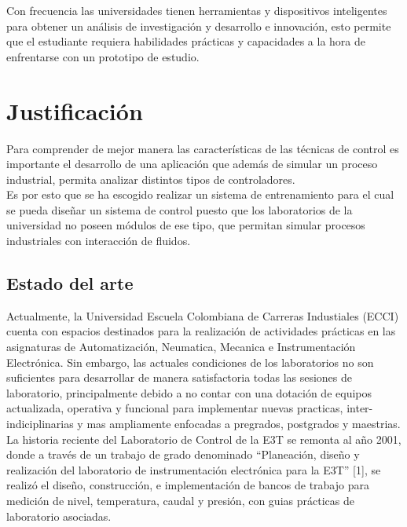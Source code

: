 \documentclass[a4paper,12pt,twoside]{proyectotanquesecci}
\begin{document}
Con frecuencia las universidades tienen herramientas y dispositivos inteligentes para obtener un análisis de investigación y desarrollo e innovación, esto permite que el estudiante requiera habilidades prácticas y capacidades a la hora de enfrentarse con un prototipo de estudio.\\






\chapter{Justificación}

Para comprender de mejor manera las características de las técnicas de control es importante el desarrollo de una aplicación que además de simular un proceso industrial, permita analizar distintos tipos de controladores. \\

Es por esto que se ha escogido realizar un sistema de entrenamiento para el cual se pueda diseñar un sistema de control puesto que los laboratorios de la universidad no poseen módulos de ese tipo, que permitan simular procesos industriales con interacción de fluidos. \\

\section{Estado del arte}



Actualmente, la Universidad Escuela Colombiana de Carreras Industiales (ECCI) cuenta con espacios destinados para la realización de actividades prácticas en las asignaturas de Automatización, Neumatica, Mecanica e Instrumentación Electrónica. Sin embargo, las actuales condiciones de los laboratorios no son suficientes para desarrollar de manera satisfactoria todas las sesiones de laboratorio, principalmente debido a no contar con una dotación de equipos actualizada, operativa y funcional para implementar nuevas practicas, inter-indiciplinarias y mas ampliamente enfocadas a pregrados, postgrados y maestrias. La historia reciente del Laboratorio de Control de la E3T se remonta al año 2001, donde a través de un trabajo de grado denominado “Planeación, diseño y realización del laboratorio de instrumentación electrónica para la E3T” [1], se realizó el diseño, construcción, e implementación de bancos de trabajo para medición de nivel, temperatura, caudal y presión, con guias prácticas de laboratorio asociadas. \\
\end{document}
